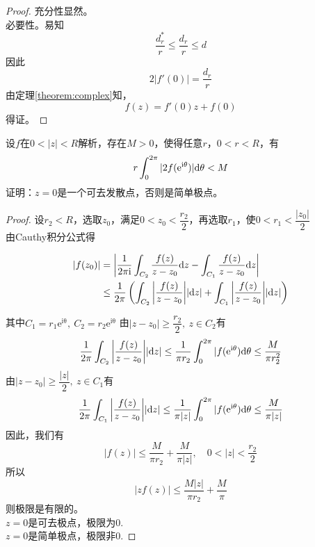 \begin{proof}

    充分性显然。\\
    必要性。易知
    $$\dfrac{d_r^{*}}{r} \leq \dfrac{d_r}{r} \leq d$$
    因此
    $$2|f'(0)| = \dfrac{d_r}{r}$$
    由定理\ref{theorem:complex}知，
    $$f(z) = f'(0)z + f(0)$$
    得证。

\end{proof}

\begin{proposition}
    
    设$f$在$0 < |z| < R$解析，存在$M >0$，使得任意$r$，$0 < r < R$，有
    $$r \int_{0}^{2 \pi}{|2f(\mathrm{e^{i\theta}})|}\mathrm{d} \theta < M$$
    证明：$z=0$是一个可去发散点，否则是简单极点。

\end{proposition}

\begin{proof}
    
    设$r_2 < R$，选取$z_0$，满足$0 < z_0 < \dfrac{r_2}{2}$，再选取$r_1$，使$0 < r_1 < \dfrac{|z_0|}{2}$\\
    由\textup{Cauthy}积分公式得

    \begin{align*}
        |f(z_0)| & = \left| \dfrac{1}{2\mathrm{\pi i}} \int_{C_2}{\dfrac{f(z)}{z-z_0}}\mathrm{d} z - \int_{C_1}{\dfrac{f(z)}{z-z_0}}\mathrm{d} z \right|\\
        & \leq \dfrac{1}{2 \pi} \left(\int_{C_2}{\left|\dfrac{f(z)}{z-z_0}\right|}|\mathrm{d} z| + \int_{C_1}{\left|\dfrac{f(z)}{z-z_0}\right|}|\mathrm{d} z|\right)
    \end{align*}

    其中$C_1 = r_1\mathrm{e^{i\theta}},\ C_2 = r_2\mathrm{e^{i\theta}}$
    由$|z-z_0| \geq \dfrac{r_2}{2},\ z \in C_2$有
    $$ \dfrac{1}{2 \pi} \int_{C_2}{\left| \dfrac{f(z)}{z-z_0}\right|}|\mathrm{d} z| \leq \dfrac{1}{ \pi r_2}\int_{0}^{2 \pi}{|f(\mathrm{e}^{\mathrm{i}\theta})}\mathrm{d} \theta \leq \dfrac{M}{ \pi r_2^2}$$
    由$|z-z_0| \geq \dfrac{|z|}{2},\ z \in C_1$有
    $$ \dfrac{1}{2 \pi} \int_{C_1}{\left| \dfrac{f(z)}{z-z_0}\right|}|\mathrm{d} z| \leq \dfrac{1}{ \pi|z|}\int_{0}^{2 \pi}{|f(\mathrm{e}^{\mathrm{i}\theta})}\mathrm{d} \theta \leq \dfrac{M}{ \pi|z|}$$
    因此，我们有
    $$|f(z)| \leq \dfrac{M}{ \pi r_2} + \dfrac{M}{ \pi|z|},\quad 0 < |z| < \dfrac{r_2}{2}$$
    所以$$|zf(z)| \leq \dfrac{M|z|}{ \pi r_2} + \dfrac{M}{\pi}$$
    则极限是有限的。\\
    $z=0$是可去极点，极限为$0$.\\
    $z=0$是简单极点，极限非$0$.

\end{proof}

